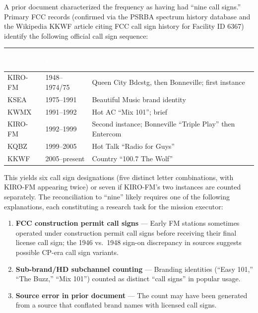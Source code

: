 \documentclass[11pt,letterpaper]{article}
\newcommand{\tableheader}[1]{\textbf{\sffamily\textcolor{white}{#1}}}
\begin{document}
A prior document characterized the frequency as having had ``nine call signs.'' Primary FCC records (confirmed via the PSRBA spectrum history database and the Wikipedia KKWF article citing FCC call sign history for Facility ID 6367) identify the following official call sign sequence:

\begin{center}
\begin{tabularx}{\textwidth}{L{3cm}L{3cm}X}
\toprule
{}
\tableheader{Call Sign} & \tableheader{Period} & \tableheader{Notes} \\
\midrule
KIRO-FM & 1948--1974/75 & Queen City Bdcstg, then Bonneville; first instance \\
KSEA & 1975--1991 & Beautiful Music brand identity \\
KWMX & 1991--1992 & Hot AC ``Mix 101''; brief \\
KIRO-FM & 1992--1999 & Second instance; Bonneville ``Triple Play'' then Entercom \\
KQBZ & 1999--2005 & Hot Talk ``Radio for Guys'' \\
KKWF & 2005--present & Country ``100.7 The Wolf'' \\
\bottomrule
\end{tabularx}
\end{center}

This yields six call sign designations (five distinct letter combinations, with KIRO-FM appearing twice) or seven if KIRO-FM's two instances are counted separately. The reconciliation to ``nine'' likely requires one of the following explanations, each constituting a research task for the mission executor:

\begin{enumerate}[leftmargin=2em]
  \item \textbf{FCC construction permit call signs} --- Early FM stations sometimes operated under construction permit call signs before receiving their final license call sign; the 1946 vs.\ 1948 sign-on discrepancy in sources suggests possible CP-era call sign variants.
  \item \textbf{Sub-brand/HD subchannel counting} --- Branding identities (``Easy 101,'' ``The Buzz,'' ``Mix 101'') counted as distinct ``call signs'' in popular usage.
  \item \textbf{Source error in prior document} --- The count may have been generated from a source that conflated brand names with licensed call signs.
\end{enumerate}
\end{document}
